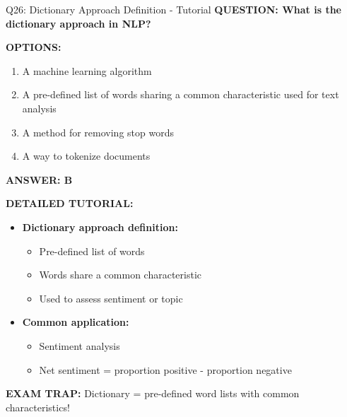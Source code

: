 \documentclass[8pt]{beamer}
\begin{document}
	\begin{frame}{Q26: Dictionary Approach Definition - Tutorial}
		\fontsize{6.5}{7.5}\selectfont
		\textbf{QUESTION: What is the dictionary approach in NLP?}
		
		\vspace{0.1cm}
		\textbf{OPTIONS:}
		\begin{enumerate}
			\item A machine learning algorithm
			\item A pre-defined list of words sharing a common characteristic used for text analysis
			\item A method for removing stop words
			\item A way to tokenize documents
		\end{enumerate}
		
		\vspace{0.1cm}
		\textcolor{myblue}{\textbf{ANSWER: B}}
		
		\vspace{0.1cm}
		\textbf{DETAILED TUTORIAL:}
		\begin{itemize}
			\item \textbf{Dictionary approach definition:}
			\begin{itemize}
				\item Pre-defined list of words
				\item Words share a common characteristic
				\item Used to assess sentiment or topic
			\end{itemize}
			\item \textbf{Common application:}
			\begin{itemize}
				\item Sentiment analysis
				\item Net sentiment = proportion positive - proportion negative
			\end{itemize}
		\end{itemize}
		
		\textcolor{myred}{\textbf{EXAM TRAP:}} Dictionary = \textcolor{myblue}{pre-defined word lists with common characteristics}!
	\end{frame}
	
\end{document}
